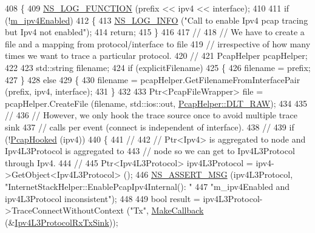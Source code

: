 \begin{DoxyCode}
408 \{
409   \hyperlink{log-macros-disabled_8h_a90b90d5bad1f39cb1b64923ea94c0761}{NS\_LOG\_FUNCTION} (prefix << ipv4 << interface);
410 
411   \textcolor{keywordflow}{if} (!\hyperlink{classns3_1_1InternetStackHelper_a52b041bc6e084a821e6885c71d38df31}{m\_ipv4Enabled})
412     \{
413       \hyperlink{group__logging_gafbd73ee2cf9f26b319f49086d8e860fb}{NS\_LOG\_INFO} (\textcolor{stringliteral}{"Call to enable Ipv4 pcap tracing but Ipv4 not enabled"});
414       \textcolor{keywordflow}{return};
415     \}
416 
417   \textcolor{comment}{//}
418   \textcolor{comment}{// We have to create a file and a mapping from protocol/interface to file }
419   \textcolor{comment}{// irrespective of how many times we want to trace a particular protocol.}
420   \textcolor{comment}{//}
421   PcapHelper pcapHelper;
422 
423   std::string filename;
424   \textcolor{keywordflow}{if} (explicitFilename)
425     \{
426       filename = prefix;
427     \}
428   \textcolor{keywordflow}{else}
429     \{
430       filename = pcapHelper.GetFilenameFromInterfacePair (prefix, ipv4, interface);
431     \}
432 
433   Ptr<PcapFileWrapper> file = pcapHelper.CreateFile (filename, std::ios::out, 
      \hyperlink{classns3_1_1PcapHelper_a2ee4dad28ddd9a1fe636f51835eaa77facaa0d4a941d8f04ddafaa202c18298c1}{PcapHelper::DLT\_RAW});
434 
435   \textcolor{comment}{//}
436   \textcolor{comment}{// However, we only hook the trace source once to avoid multiple trace sink}
437   \textcolor{comment}{// calls per event (connect is independent of interface).}
438   \textcolor{comment}{//}
439   \textcolor{keywordflow}{if} (!\hyperlink{classns3_1_1InternetStackHelper_a884260b23b3df90bf09eeb403df4d988}{PcapHooked} (ipv4))
440     \{
441       \textcolor{comment}{//}
442       \textcolor{comment}{// Ptr<Ipv4> is aggregated to node and Ipv4L3Protocol is aggregated to }
443       \textcolor{comment}{// node so we can get to Ipv4L3Protocol through Ipv4.}
444       \textcolor{comment}{//}
445       Ptr<Ipv4L3Protocol> ipv4L3Protocol = ipv4->GetObject<Ipv4L3Protocol> ();
446       \hyperlink{assert_8h_aff5ece9066c74e681e74999856f08539}{NS\_ASSERT\_MSG} (ipv4L3Protocol, \textcolor{stringliteral}{"InternetStackHelper::EnablePcapIpv4Internal(): "}
447                      \textcolor{stringliteral}{"m\_ipv4Enabled and ipv4L3Protocol inconsistent"});
448 
449       \textcolor{keywordtype}{bool} result = ipv4L3Protocol->TraceConnectWithoutContext (\textcolor{stringliteral}{"Tx"}, 
      \hyperlink{group__makecallbackmemptr_ga9376283685aa99d204048d6a4b7610a4}{MakeCallback} (&\hyperlink{namespacens3_a6531bb0b805a5b9a1ef7f4f1c4fb8002}{Ipv4L3ProtocolRxTxSink}));

\end{DoxyCode}
